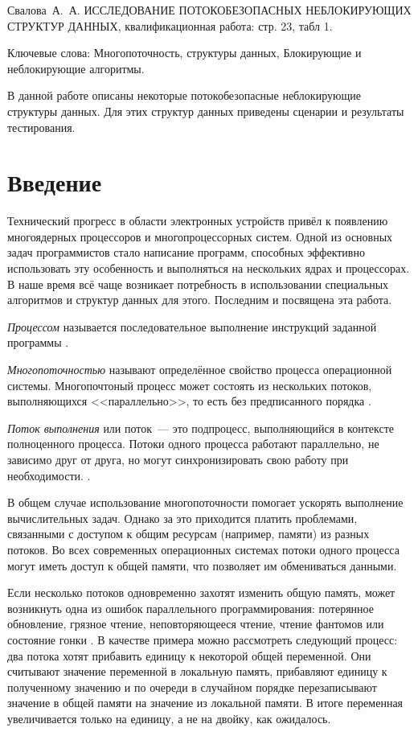 \documentclass[12pt]{report}
\begin{document}
		\par Свалова~А.~А. ИССЛЕДОВАНИЕ ПОТОКОБЕЗОПАСНЫХ НЕБЛОКИРУЮЩИХ СТРУКТУР ДАННЫХ, квалификационная работа: стр. 23, табл 1.
		\par Ключевые слова: Многопоточность, структуры данных, Блокирующие и неблокирующие алгоритмы.
		\par В данной работе описаны некоторые потокобезопасные неблокирующие структуры данных. Для этих структур данных приведены сценарии и результаты тестирования.
	
	\newpage
	
	{\pagestyle{plain}
		
		\chapter*{Введение}
		
		\large Технический прогресс в области электронных устройств привёл к появлению многоядерных процессоров и многопроцессорных систем. Одной из основных задач программистов стало написание программ, способных эффективно использовать эту особенность и выполняться на нескольких ядрах и процессорах. В наше время всё чаще возникает потребность в использовании специальных алгоритмов и структур данных для этого. Последним и посвящена эта работа.
		
		\textit{Процессом} называется последовательное выполнение инструкций заданной программы \cite{Tanenb}. 
		
		\textit{Многопоточностью} называют определённое свойство процесса операционной системы. Многопочтоный процесс может состоять из нескольких потоков, выполняющихся <<параллельно>>, то есть без предписанного порядка \cite{Tanenb}. 
		
		\textit{Поток выполнения} или поток~--- это подпроцесс, выполняющийся в контексте полноценного процесса. Потоки одного процесса работают параллельно, не зависимо друг от друга, но могут синхронизировать свою работу при необходимости. \cite{Tanenb}.
		
		В общем случае использование многопоточности помогает ускорять выполнение вычислительных задач. Однако за это приходится платить проблемами, связанными с доступом к общим ресурсам (например, памяти) из разных потоков. Во всех современных операционных системах потоки одного процесса могут иметь доступ к общей памяти, что позволяет им обмениваться данными.
		
		Если несколько потоков одновременно захотят изменить общую память, может возникнуть одна из ошибок параллельного программирования: потерянное обновление, грязное чтение, неповторяющееся чтение, чтение фантомов или состояние гонки \cite{wikiRace}.
		В качестве примера можно рассмотреть следующий процесс: два потока хотят прибавить единицу к некоторой общей переменной. Они считывают значение переменной в локальную память, прибавляют единицу к полученному значению и по очереди в случайном порядке перезаписывают значение в общей памяти на значение из локальной памяти. В итоге переменная увеличивается только на единицу, а не на двойку, как ожидалось.
		
}
\end{document}
